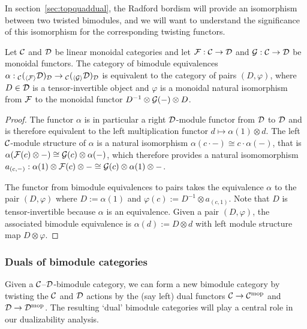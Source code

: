 \documentclass{amsart}
\begin{document}
In section~\ref{sec:topquaddual}, the Radford bordism will provide an isomorphism between two twisted bimodules, and we will want to understand the significance of this isomorphism for the corresponding twisting functors.

\begin{lemma} \label{lem:BimoduleToFunctor}
Let $\mathcal C$ and $\mathcal D$ be linear monoidal categories and let $\mathcal F: \mathcal C \rightarrow \mathcal D$ and $\mathcal G: \mathcal C \rightarrow \mathcal D$ be monoidal functors.  The category of bimodule equivalences $\alpha: {}_\mathcal C ({}_{\langle \mathcal F \rangle} \mathcal D)_\mathcal D \rightarrow {}_\mathcal C ({}_{\langle \mathcal G \rangle} \mathcal D)_\mathcal D$ is equivalent to the category of pairs $(D, \varphi)$, where $D \in \mathcal D$ is a tensor-invertible object and $\varphi$ is a monoidal natural isomorphism from $\mathcal F$ to the monoidal functor $D^{-1} \otimes \mathcal G(-) \otimes D$.
\end{lemma}
\begin{proof}
The functor $\alpha$ is in particular a right $\mathcal D$-module functor from $\mathcal D$ to $\mathcal D$ and is therefore equivalent to the left multiplication functor $d \mapsto \alpha(1) \otimes d$.  The left $\mathcal C$-module structure of $\alpha$ is a natural isomorphism $\alpha(c \cdot -) \cong c \cdot \alpha(-)$, that is $\alpha(\mathcal F(c) \otimes -) \cong \mathcal G(c) \otimes \alpha(-)$, which therefore provides a natural isomomorphism $a_{(c,-)}: \alpha(1) \otimes \mathcal F(c) \otimes - \cong \mathcal G(c) \otimes \alpha(1) \otimes -$.

The functor from bimodule equivalences to pairs takes the equivalence $\alpha$ to the pair $(D,\varphi)$ where $D:=\alpha(1)$ and $\varphi(c) := D^{-1} \otimes a_{(c,1)}$.  Note that $D$ is tensor-invertible because $\alpha$ is an equivalence.  Given a pair $(D,\varphi)$, the associated bimodule equivalence is $\alpha(d) := D \otimes d$ with left module structure map $D \otimes \varphi$.
\end{proof}


\subsubsection{Duals of bimodule categories}

Given a $\mathcal C$--$\mathcal D$-bimodule category, we can form a new bimodule category by twisting the $\mathcal C$ and $\mathcal D$ actions by the (say left) dual functors $\mathcal C \rightarrow \mathcal C^{\mathrm{mop}}$ and $\mathcal D \rightarrow \mathcal D^{\mathrm{mop}}$.  The resulting `dual' bimodule categories will play a central role in our dualizability analysis.
\end{document}
